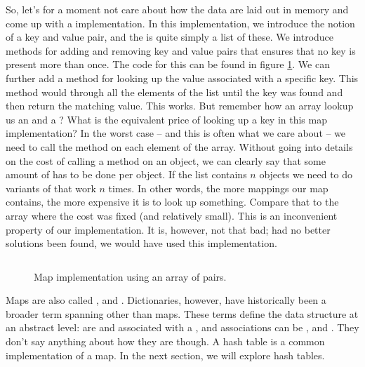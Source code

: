 So, let's for a moment not care about how the data are laid out in memory and come up with a  implementation. In this implementation, we introduce the notion of a key and value pair, and the  is quite simply a list of these. We introduce methods for adding and removing key and value pairs that ensures that no key is present more than once. The code for this can be found in figure \ref{fig:collections:map:arrayofpairs}. We can further add a method for looking up the value associated with a specific key. This method would  through all the elements of the list until the key was found and then return the matching value. This works. But remember how an array lookup  us an  and a ? What is the equivalent price of looking up a key in this map implementation? In the worst case -- and this is often what we care about -- we need to call the  method on each element of the array. Without going into details on the cost of calling a method on an object, we can clearly say that some amount of  has to be done per object. If the list contains $n$ objects we need to do variants of that work $n$ times. In other words, the more mappings our map contains, the more expensive it is to look up something. Compare that to the array where the cost was fixed (and relatively small). This is an inconvenient property of our implementation. It is, however, not that bad; had no better solutions been found, we would have used this implementation.

\begin{figure}[tbp]
  \inputminted{csharp}{../src/csharp/collections/map_array/Map.cs}
  \caption{Map implementation using an array of pairs.}
  \label{fig:collections:map:arrayofpairs}
\end{figure}

Maps are also called , and . Dictionaries, however, have historically been a broader term spanning  other than maps. These terms define the data structure at an abstract level:  are  and associated with a , and associations can be ,  and . They don't say anything about how they are  though. A hash table is a common implementation of a map. In the next section, we will explore hash tables.

